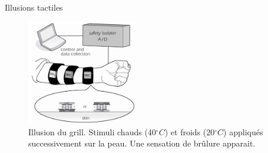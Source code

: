 \documentclass[compress, noflama]{beamer}
\begin{document}
{
\begin{frame}{Illusions tactiles}
\begin{figure}
\centering
\includegraphics[width=5cm]{images/thermalgrill}
\caption{Illusion du grill. Stimuli chauds (40$^{\circ}C$) et froids (20$^{\circ}C$) appliqués successivement sur la peau. Une sensation de brûlure apparait.}
\end{figure}
\end{frame}
}
\end{document}
